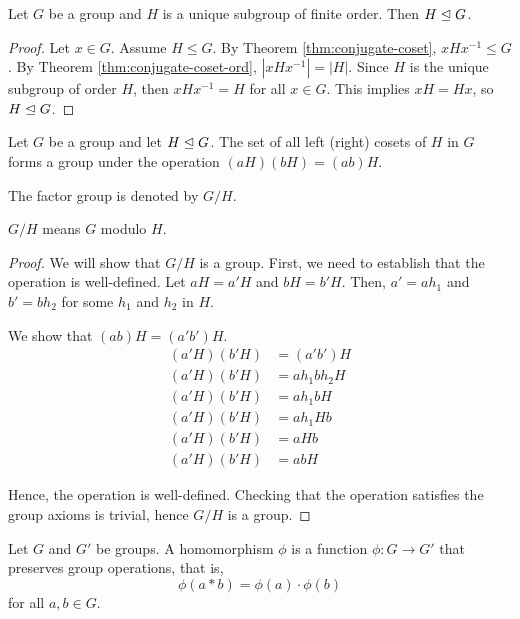     \begin{thm}
        Let \(G\) be a group and \(H\) is a unique subgroup of finite order. Then \(H \trianglelefteq G\).
    \end{thm}

    \begin{proof}
        Let \(x\in G\). Assume \(H \leq G\). By Theorem \ref{thm:conjugate-coset}, \(xHx^{-1} \leq G\). By Theorem \ref{thm:conjugate-coset-ord}, \(|xHx^{-1}| = |H|\). Since \(H\) is the unique subgroup of order \(H\), then \(xHx^{-1} = H\) for all \(x \in G\). This implies \(xH = Hx\), so \(H \trianglelefteq G\).
    \end{proof}

    \begin{thm}
        Let \(G\) be a group and let \(H \trianglelefteq G\). The set of all left (right) cosets of \(H\) in \(G\) forms a group under the operation \((aH)(bH) = (ab)H.\)

        The factor group is denoted by \(G/H\).
    \end{thm}

    \begin{note}
        \(G/H\) means \(G\) modulo \(H\).
    \end{note}

    \begin{proof}
        We will show that \(G/H\) is a group. First, we need to establish that the operation is well-defined. Let \(aH = a'H\) and \(bH = b'H\). Then, \(a' = ah_1\) and \(b' = bh_2\) for some \(h_1\) and \(h_2\) in \(H\).

        We show that \((ab)H = (a'b')H\).
        \begin{align*}
            (a'H)(b'H) &= (a'b')H \\
            (a'H)(b'H) &= ah_1bh_2H \\
            (a'H)(b'H) &= ah_1bH \\
            (a'H)(b'H) &= ah_1Hb \\
            (a'H)(b'H) &= aHb \\
            (a'H)(b'H) &= abH
        \end{align*}

        Hence, the operation is well-defined. Checking that the operation satisfies the group axioms is trivial, hence \(G/H\) is a group.
    \end{proof}

    \begin{dfn}
        Let \(G\) and \(G'\) be groups. A homomorphism \(\phi\) is a function \(\phi : G \to G'\) that preserves group operations, that is, \[\phi(a * b) = \phi(a) \cdot \phi(b)\] for all \(a, b\in G\).
    \end{dfn}

